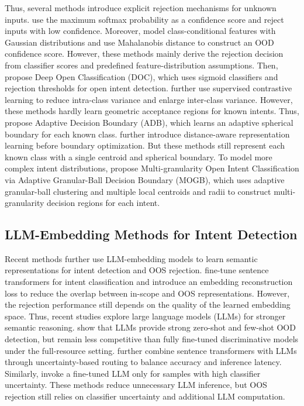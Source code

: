 \documentclass[11pt]{article}
\begin{document}
Thus, several methods introduce explicit rejection mechanisms for unknown inputs. \citet{hendrycks2017baseline} use the maximum softmax probability as a confidence score and reject inputs with low confidence. Moreover, \citet{lee2018simple} model class-conditional features with Gaussian distributions and use Mahalanobis distance to construct an OOD confidence score. However, these methods mainly derive the rejection decision from classifier scores and predefined feature-distribution assumptions. Then, \citet{shu2017doc} propose Deep Open Classification (DOC), which uses sigmoid classifiers and rejection thresholds for open intent detection. \citet{zeng2021modeling} further use supervised contrastive learning to reduce intra-class variance and enlarge inter-class variance. However, these methods hardly learn geometric acceptance regions for known intents. Thus, \citet{zhang2021adaptive} propose Adaptive Decision Boundary (ADB), which learns an adaptive spherical boundary for each known class. \citet{zhang2023learning} further introduce distance-aware representation learning before boundary optimization. But these methods still represent each known class with a single centroid and spherical boundary. To model more complex intent distributions, \citet{li2025multi} propose Multi-granularity Open Intent Classification via Adaptive Granular-Ball Decision Boundary (MOGB), which uses adaptive granular-ball clustering and multiple local centroids and radii to construct multi-granularity decision regions for each intent.

\subsection{LLM-Embedding Methods for Intent Detection}
Recent methods further use LLM-embedding models to learn semantic representations for intent detection and OOS rejection. \citet{zhang2024new} fine-tune sentence transformers for intent classification and introduce an embedding reconstruction loss to reduce the overlap between in-scope and OOS representations. However, the rejection performance still depends on the quality of the learned embedding space. Thus, recent studies explore large language models (LLMs) for stronger semantic reasoning. \citet{wang2024beyond} show that LLMs provide strong zero-shot and few-shot OOD detection, but remain less competitive than fully fine-tuned discriminative models under the full-resource setting. \citet{arora2024intent} further combine sentence transformers with LLMs through uncertainty-based routing to balance accuracy and inference latency. Similarly, \citet{zaera2025efficient} invoke a fine-tuned LLM only for samples with high classifier uncertainty. These methods reduce unnecessary LLM inference, but OOS rejection still relies on classifier uncertainty and additional LLM computation.
\end{document}
